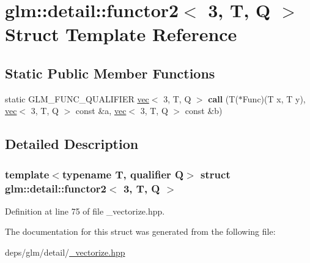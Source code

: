 \hypertarget{structglm_1_1detail_1_1functor2_3_013_00_01T_00_01Q_01_4}{}\section{glm\+:\+:detail\+:\+:functor2$<$ 3, T, Q $>$ Struct Template Reference}
\label{structglm_1_1detail_1_1functor2_3_013_00_01T_00_01Q_01_4}
\subsection*{Static Public Member Functions}
\begin{DoxyCompactItemize}
\item 
\mbox{\label{structglm_1_1detail_1_1functor2_3_013_00_01T_00_01Q_01_4_ad26040a8693201baea2ceb8561d14209}} 
static G\+L\+M\+\_\+\+F\+U\+N\+C\+\_\+\+Q\+U\+A\+L\+I\+F\+I\+ER \hyperlink{structglm_1_1vec}{vec}$<$ 3, T, Q $>$ {\bfseries call} (T($\ast$Func)(T x, T y), \hyperlink{structglm_1_1vec}{vec}$<$ 3, T, Q $>$ const \&a, \hyperlink{structglm_1_1vec}{vec}$<$ 3, T, Q $>$ const \&b)
\end{DoxyCompactItemize}


\subsection{Detailed Description}
\subsubsection*{template$<$typename T, qualifier Q$>$\newline
struct glm\+::detail\+::functor2$<$ 3, T, Q $>$}



Definition at line 75 of file \+\_\+vectorize.\+hpp.



The documentation for this struct was generated from the following file\+:\begin{DoxyCompactItemize}
\item 
deps/glm/detail/\hyperlink{__vectorize_8hpp}{\+\_\+vectorize.\+hpp}\end{DoxyCompactItemize}
